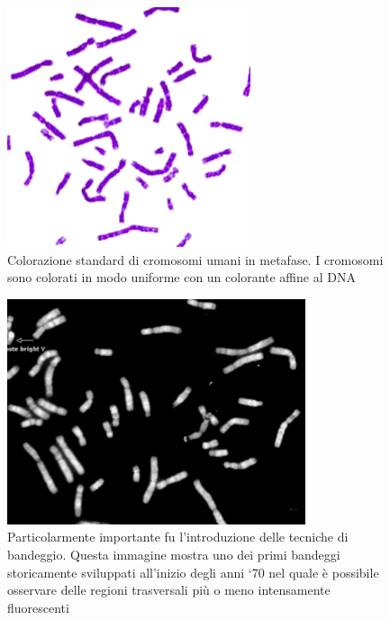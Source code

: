 \documentclass[11pt]{book}
\begin{document}
\begin{figure}[h!]
\includegraphics[scale=0.50]{img/07_cromoumani.png}
\centering
\caption{Colorazione standard di cromosomi umani in metafase. I cromosomi sono colorati in modo uniforme con un colorante affine al DNA}
\label{}
\end{figure}

\begin{figure}[h!]
\centering
\includegraphics[scale=0.50]{img/08_cromobandeggi.png}
\caption{Particolarmente importante fu l’introduzione delle tecniche di bandeggio. Questa immagine mostra uno dei primi bandeggi storicamente sviluppati all’inizio degli anni `70 nel quale è possibile osservare delle regioni trasversali più o meno intensamente fluorescenti}
\label{}
\end{figure}
\end{document}
